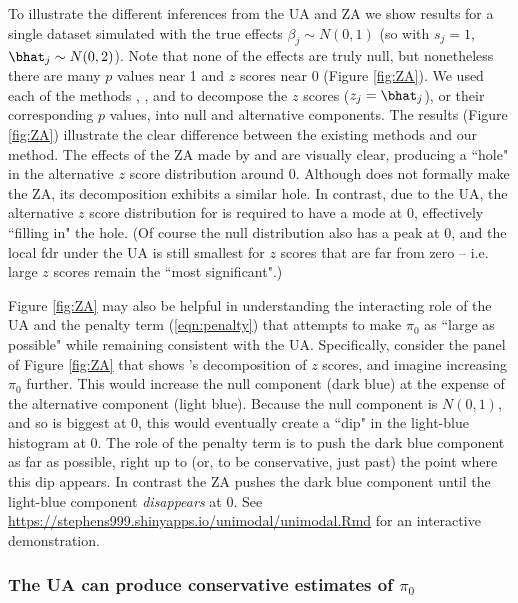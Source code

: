 To illustrate the different inferences from the UA and ZA we show results for a single
dataset simulated with the true effects $\beta_j \sim N(0,1)$ (so with $s_j=1$, $\bhat_j  \sim N(0,2)$). Note that none of the effects are truly null,
but nonetheless there are many $p$ values near 1 and $z$ scores near 0 (Figure \ref{fig:ZA}).  We used each of the methods
\qvalue, \locfdr, \mixfdr and \ashr to decompose the $z$ scores ($z_j = \bhat_j$), or their corresponding $p$ values, into null and alternative components.
The results (Figure \ref{fig:ZA}) illustrate the clear difference between the existing methods and our method. The effects of the ZA made by \qvalue and \locfdr
are visually clear, producing a ``hole"  in the alternative $z$ score distribution around 0. Although \mixfdr does not formally make the ZA, its decomposition
exhibits a similar hole. In contrast, due to the UA, the alternative $z$ score distribution for \ashr is required to have a mode at 0, 
effectively ``filling in" the hole.  (Of course the null distribution also has a peak at 0, and the local fdr 
 under the UA is still smallest for $z$ scores that are far from zero -- i.e. large $z$ scores remain the ``most significant".)

Figure \ref{fig:ZA} may also be helpful in understanding the interacting role of the UA and the penalty term (\ref{eqn:penalty}) that attempts to make $\pi_0$ as ``large as possible" while remaining consistent with the UA. Specifically, consider the panel of Figure \ref{fig:ZA} that shows \ashr's decomposition of $z$ scores, and imagine increasing $\pi_0$ further. This would increase the null component (dark blue) at the expense of
the alternative component (light blue). Because the null component is $N(0,1)$, and so is biggest at 0, this would eventually create a ``dip" in the light-blue histogram at 0. The role of the penalty term is to push the dark blue component as far as possible, right up to (or, to be conservative, just past) the point where this dip appears. In contrast the ZA pushes the dark blue component until the light-blue component {\it disappears} at 0. See \url{https://stephens999.shinyapps.io/unimodal/unimodal.Rmd} for an interactive
demonstration.

\subsubsection*{The UA can produce conservative estimates of $\pi_0$}

